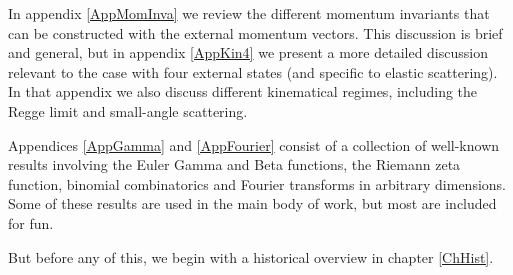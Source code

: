 In appendix \ref{AppMomInva} we review the different momentum invariants that can be constructed with the external momentum vectors. This discussion is brief and general, but in appendix \ref{AppKin4} we present a more detailed discussion relevant to the case with four external states (and specific to elastic scattering). In that appendix we also discuss different kinematical regimes, including the Regge limit and small-angle scattering.

Appendices \ref{AppGamma} and \ref{AppFourier} consist of a collection of well-known results involving the Euler Gamma and Beta functions, the Riemann zeta function, binomial combinatorics and Fourier transforms in arbitrary dimensions. Some of these results are used in the main body of work, but most are included for fun.

But before any of this, we begin with a historical overview in chapter \ref{ChHist}.